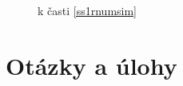 \documentclass[a4paper, 10pt, ]{article}
\begin{document}
\begin{figure}[t]
	\centering


	\caption{k časti \ref{ss1rnumsim}}
	\label{fig_tex_02_2}

\end{figure}











\section*{Otázky a úlohy}
\end{document}
